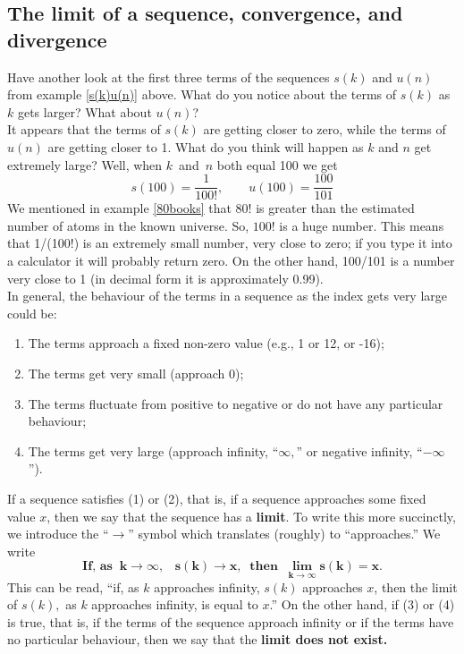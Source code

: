 \subsection{The limit of a sequence, convergence, and divergence} \label{sectionlimit}
Have another look at the first three terms of the sequences $s(k)$ and $u(n)$ from example \ref{s(k)u(n)} above. What do you notice about the terms of $s(k)$ as $k$ gets larger? What about $u(n)$? \\

\noindent It appears that the terms of $s(k)$ are getting closer to zero, while the terms of $u(n)$ are getting closer to 1. What do you think will happen as $k$ and $n$ get extremely large? Well, when $k$~and~$n$ both equal 100 we get
\[
s(100) = \frac{1}{100!}, \qquad u(100) = \frac{100}{101}
\]
We mentioned in example \ref{80books} that $80!$ is greater than the estimated number of atoms in the known universe. So, $100!$ is a huge number. This means that 1/(100!) is an extremely small number, very close to zero; if you type it into a calculator it will probably return zero. On the other hand, 100/101 is a number very close to 1 (in decimal form it is approximately 0.99). \\

In general, the behaviour of the terms in a sequence as the index gets very large could be:
\begin{enumerate}[(1)]
\item The terms approach a fixed non-zero value (e.g., 1 or 12, or -16);
\item The terms get very small (approach 0);
\item The terms fluctuate from positive to negative or do not have any particular behaviour;
\item The terms get very large (approach infinity, ``$\infty,$'' or negative infinity, ``$-\infty$''). \label{symbinfty} \label{limit sequence}
\end{enumerate}

\noindent If a sequence satisfies (1) or (2), that is, if a sequence approaches some fixed value $x$, then we say that the sequence has a \textbf{limit}. To write this more succinctly, we introduce the ``$\rightarrow$'' symbol which translates (roughly) to ``approaches.'' We write
\[
\boldsymbol{\textbf{If, as} \;\; k \rightarrow \infty, \;\;\; s(k) \rightarrow x, \;\; \textbf{then} \;\; \lim_{k \rightarrow \infty}s(k) = x.} \label{symbrightarrow}
\]
This can be read, ``if, as $k$ approaches infinity, $s(k)$ approaches $x$, then the limit of $s(k),$ as $k$ approaches infinity, is equal to $x$.'' On the other hand, if (3) or (4) is true, that is, if the terms of the sequence approach infinity or if the terms have no particular behaviour, then we say that the \textbf{limit does not exist.} \\

